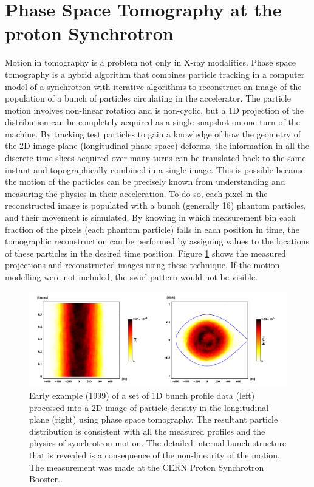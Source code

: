 \section{Phase Space Tomography at the proton Synchrotron}

Motion in tomography is a problem not only in X-ray modalities. Phase space tomography is a hybrid algorithm that combines particle tracking in a computer model of a synchrotron with iterative algorithms to reconstruct an image of the population of a bunch of particles circulating in the accelerator. The particle motion involves non-linear rotation and is non-cyclic, but a 1D projection of the distribution can be completely acquired as a single snapshot on one turn of the machine. By tracking test particles to gain a knowledge of how the geometry of the 2D image plane (longitudinal phase space) deforms, the information in all the discrete time slices acquired over many turns can be translated back to the same instant and topographically combined in a single image. This is possible because the motion of the particles can be precisely known from understanding and measuring the physics in their acceleration. To do so, each pixel in the reconstructed image is populated with a bunch (generally 16) phantom particles, and their movement is simulated. By knowing in which measurement bin each fraction of the pixels (each phantom particle) falls in each position in time, the tomographic reconstruction can be performed by assigning values to the locations of these particles in the desired time position. Figure \ref{fig:PST} shows the measured projections and reconstructed images using these technique. If the motion modelling were not included, the swirl pattern would not be visible.

\begin{figure}

\begin{center} 

\includegraphics[width=\linewidth]{StateOfArt/Tosca2016fig.png} 

\caption[Phase space tomography]{\label{fig:PST} Early example (1999) of a set of 1D bunch profile data (left) processed into a 2D image of particle density in the longitudinal plane (right) using phase space tomography.  The resultant particle distribution is consistent with all the measured profiles and the physics of synchrotron motion.  The detailed internal bunch structure that is revealed is a consequence of the non-linearity of the motion.  The measurement was made at the CERN Proton Synchrotron Booster.\cite{pstweb}.} 
\end{center} 
\end{figure}


